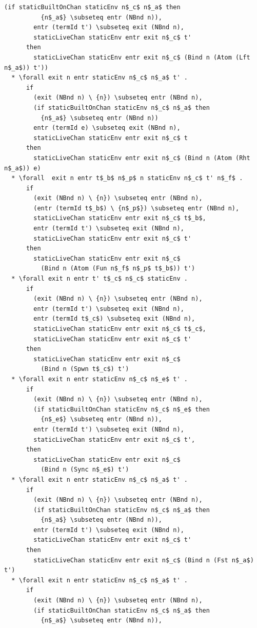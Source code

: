 \documentclass[letterpaper, 11pt]{extarticle}
\begin{document}
\begin{lstlisting}[language=logic, mathescape]
        (if staticBuiltOnChan staticEnv n$_c$ n$_a$ then
          {n$_a$} \subseteq entr (NBnd n)),
        entr (termId t') \subseteq exit (NBnd n),
        staticLiveChan staticEnv entr exit n$_c$ t'
      then
        staticLiveChan staticEnv entr exit n$_c$ (Bind n (Atom (Lft n$_a$)) t'))
  * \forall exit n entr staticEnv n$_c$ n$_a$ t' . 
      if
        (exit (NBnd n) \ {n}) \subseteq entr (NBnd n),
        (if staticBuiltOnChan staticEnv n$_c$ n$_a$ then
          {n$_a$} \subseteq entr (NBnd n))
        entr (termId e) \subseteq exit (NBnd n),
        staticLiveChan staticEnv entr exit n$_c$ t
      then
        staticLiveChan staticEnv entr exit n$_c$ (Bind n (Atom (Rht n$_a$)) e)
  * \forall  exit n entr t$_b$ n$_p$ n staticEnv n$_c$ t' n$_f$ . 
      if
        (exit (NBnd n) \ {n}) \subseteq entr (NBnd n),
        (entr (termId t$_b$) \ {n$_p$}) \subseteq entr (NBnd n),
        staticLiveChan staticEnv entr exit n$_c$ t$_b$,
        entr (termId t') \subseteq exit (NBnd n),
        staticLiveChan staticEnv entr exit n$_c$ t'
      then
        staticLiveChan staticEnv entr exit n$_c$
          (Bind n (Atom (Fun n$_f$ n$_p$ t$_b$)) t')
  * \forall exit n entr t' t$_c$ n$_c$ staticEnv .
      if
        (exit (NBnd n) \ {n}) \subseteq entr (NBnd n),
        entr (termId t') \subseteq exit (NBnd n),
        entr (termId t$_c$) \subseteq exit (NBnd n),
        staticLiveChan staticEnv entr exit n$_c$ t$_c$,
        staticLiveChan staticEnv entr exit n$_c$ t'
      then
        staticLiveChan staticEnv entr exit n$_c$
          (Bind n (Spwn t$_c$) t')
  * \forall exit n entr staticEnv n$_c$ n$_e$ t' .
      if
        (exit (NBnd n) \ {n}) \subseteq entr (NBnd n),
        (if staticBuiltOnChan staticEnv n$_c$ n$_e$ then
          {n$_e$} \subseteq entr (NBnd n)),
        entr (termId t') \subseteq exit (NBnd n),
        staticLiveChan staticEnv entr exit n$_c$ t',
      then
        staticLiveChan staticEnv entr exit n$_c$
          (Bind n (Sync n$_e$) t')
  * \forall exit n entr staticEnv n$_c$ n$_a$ t' .
      if
        (exit (NBnd n) \ {n}) \subseteq entr (NBnd n),
        (if staticBuiltOnChan staticEnv n$_c$ n$_a$ then
          {n$_a$} \subseteq entr (NBnd n)),
        entr (termId t') \subseteq exit (NBnd n),
        staticLiveChan staticEnv entr exit n$_c$ t'
      then
        staticLiveChan staticEnv entr exit n$_c$ (Bind n (Fst n$_a$) t')
  * \forall exit n entr staticEnv n$_c$ n$_a$ t' .
      if 
        (exit (NBnd n) \ {n}) \subseteq entr (NBnd n),
        (if staticBuiltOnChan staticEnv n$_c$ n$_a$ then
          {n$_a$} \subseteq entr (NBnd n)),

\end{lstlisting}
\end{document}
